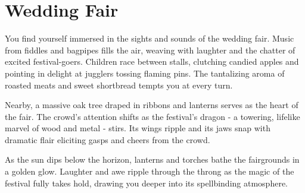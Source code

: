 \chapter*{Wedding Fair}

\begin{DndReadAloud}
	You find yourself immersed in the sights and sounds of the wedding fair. Music from fiddles and bagpipes fills the air, weaving with laughter and the chatter of excited festival-goers. Children race between stalls, clutching candied apples and pointing in delight at jugglers tossing flaming pins. The tantalizing aroma of roasted meats and sweet shortbread tempts you at every turn.

	Nearby, a massive oak tree draped in ribbons and lanterns serves as the heart of the fair. The crowd's attention shifts as the festival's dragon - a towering, lifelike marvel of wood and metal - stirs. Its wings ripple and its jaws snap with dramatic flair eliciting gasps and cheers from the crowd.

	As the sun dips below the horizon, lanterns and torches bathe the fairgrounds in a golden glow. Laughter and awe ripple through the throng as the magic of the festival fully takes hold, drawing you deeper into its spellbinding atmosphere.
\end{DndReadAloud}

